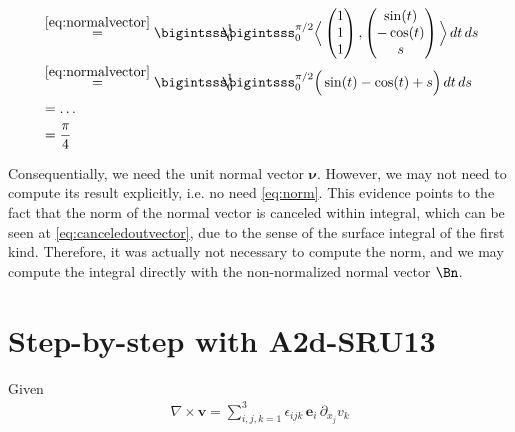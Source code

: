 \documentclass[12pt]{article}
\begin{document}
\begin{enumerate}[(i)]
\begin{align}
		       & 
		      \stackrel{\eqref{eq:normalvector}}{=}
		      \bigintsss_{0}^{1} \!\!\!\!\! \bigintsss_{0}^{\pi/2}
		      \Big\langle \begin{pmatrix} 1\\1\\1\end{pmatrix}, 
		      \begin{pmatrix} \sin(t) \\ -\cos(t) \\  s \end{pmatrix}
		      \Big\rangle  \, dt \,ds                                                                          \\
		       & 
		      \stackrel{\eqref{eq:normalvector}}{=}
		      \bigintsss_{0}^{1} \!\!\!\!\! \bigintsss_{0}^{\pi/2}
		      \Big( \sin(t) - \cos(t) + s \Big)
		      \, dt \,ds                                                                                       \\
		       & = \dots                                                                                       \\
		       & = \frac{\pi}{4}
	      \end{align}
	      
	      Consequentially, we need the unit normal vector $\bm{\nu}$.
	      However, we may not need to compute its result explicitly, i.e. no need \eqref{eq:norm}. 
	      This evidence points to the fact that 
	      the norm of the normal vector is canceled within integral,
	      which can be seen at \eqref{eq:canceledoutvector},
	      due to the sense of the surface integral of the first kind.
	      Therefore, it was actually not necessary to compute the norm, 
	      and we may compute the integral directly with the non-normalized normal vector $\Bn$.
\end{enumerate}

\clearpage
\section{Step-by-step with A2d-SRU13}
Given 
\begin{align}
	\nabla\times\bm{v} = \sum\limits_{i,j,k=1}^3 \epsilon_{ijk}\, \bm{e}_i \, \partial_{x_j}v_k
\end{align}
\end{document}
